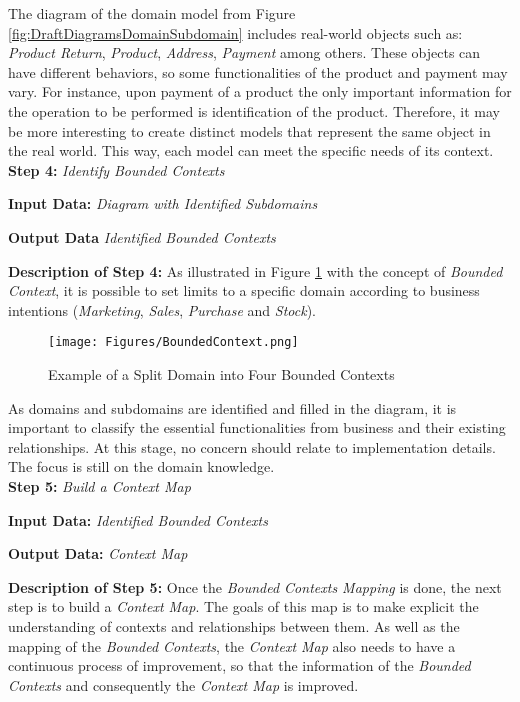 \documentclass[a4paper,twoside]{article}
\begin{document}
The diagram of the domain model from Figure \ref{fig:DraftDiagramsDomainSubdomain} includes real-world objects such as: \textit{Product Return}, \textit{Product}, \textit{Address}, \textit{Payment} among others. These objects can have different behaviors, so some functionalities of the product and payment may vary. For instance, upon payment of a product the only important information for the operation to be performed is identification of the product. Therefore, it may be more interesting to create distinct models that represent the same object in the real world. This way, each model can meet the specific needs of its context. \\

\noindent
\textbf{Step 4:}
\textit{Identify Bounded Contexts}

\textbf{Input Data:}
\textit{Diagram with Identified Subdomains}

\textbf{Output Data}
\textit{Identified Bounded Contexts}

\textbf{Description of Step 4:}
As illustrated in Figure \ref{fig:BoundedContext} with the concept of \textit{Bounded Context}, it is possible to set limits to a specific domain according to business intentions (\textit{Marketing}, \textit{Sales}, \textit{Purchase} and \textit{Stock}). \hfill \break

\begin{figure}
\centering
\texttt{[image: Figures/BoundedContext.png]}
\caption{Example of a Split Domain into Four Bounded Contexts}
\label{fig:BoundedContext}
\end{figure}

As domains and subdomains are identified and filled in the diagram, it is important to classify the essential functionalities from  business and their existing relationships. At this stage, no concern should relate to implementation details. The focus is still on the domain knowledge.\\

\noindent
\textbf{Step 5:}
\textit{Build a Context Map}

\textbf{Input Data:}
\textit{Identified Bounded Contexts}

\textbf{Output Data:}
\textit{Context Map}

\textbf{Description of Step 5:}
Once the \textit{Bounded Contexts Mapping} is done, the next step is to build a \textit{Context Map}. The goals of this map is to make explicit the understanding of contexts and relationships between them. As well as the mapping of the \textit{Bounded Contexts}, the \textit{Context Map} also needs to have a continuous process of improvement, so that the information of the \textit{Bounded Contexts} and consequently the \textit{Context Map} is improved.
\end{document}
